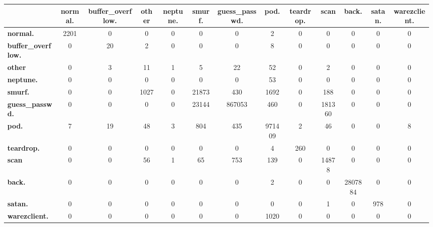 \begin{tabular}{l|cccccccccccc}
\toprule
&\textbf{normal.} & \textbf{buffer\_overflow.} & \textbf{other} & \textbf{neptune.} & \textbf{smurf.} & \textbf{guess\_passwd.} & \textbf{pod.} & \textbf{teardrop.} & \textbf{scan} & \textbf{back.} & \textbf{satan.} & \textbf{warezclient.}\\
\midrule
\textbf{normal.} & 2201 & 0 & 0 & 0 & 0 & 0 & 2 & 0 & 0 & 0 & 0 & 0\\
\textbf{buffer\_overflow.} & 0 & 20 & 2 & 0 & 0 & 0 & 8 & 0 & 0 & 0 & 0 & 0\\
\textbf{other} & 0 & 3 & 11 & 1 & 5 & 22 & 52 & 0 & 2 & 0 & 0 & 0\\
\textbf{neptune.} & 0 & 0 & 0 & 0 & 0 & 0 & 53 & 0 & 0 & 0 & 0 & 0\\
\textbf{smurf.} & 0 & 0 & 1027 & 0 & 21873 & 430 & 1692 & 0 & 188 & 0 & 0 & 0\\
\textbf{guess\_passwd.} & 0 & 0 & 0 & 0 & 23144 & 867053 & 460 & 0 & 181360 & 0 & 0 & 0\\
\textbf{pod.} & 7 & 19 & 48 & 3 & 804 & 435 & 971409 & 2 & 46 & 0 & 0 & 8\\
\textbf{teardrop.} & 0 & 0 & 0 & 0 & 0 & 0 & 4 & 260 & 0 & 0 & 0 & 0\\
\textbf{scan} & 0 & 0 & 56 & 1 & 65 & 753 & 139 & 0 & 14878 & 0 & 0 & 0\\
\textbf{back.} & 0 & 0 & 0 & 0 & 0 & 0 & 2 & 0 & 0 & 2807884 & 0 & 0\\
\textbf{satan.} & 0 & 0 & 0 & 0 & 0 & 0 & 0 & 0 & 1 & 0 & 978 & 0\\
\textbf{warezclient.} & 0 & 0 & 0 & 0 & 0 & 0 & 1020 & 0 & 0 & 0 & 0 & 0\\
\bottomrule
\end{tabular}
